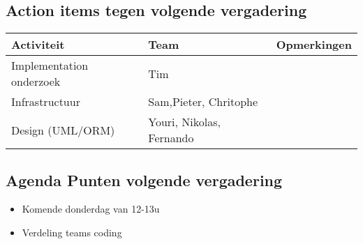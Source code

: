 \subsection{Action items tegen volgende vergadering}
\begin{table} [H]
	\centering
	\begin{tabular} {l|l|l}
		\textbf{Activiteit} & \textbf{Team} & \textbf{Opmerkingen} \\
		\hline
		Implementation onderzoek & Tim & \\
		Infrastructuur & Sam,Pieter, Chritophe & \\
		Design (UML/ORM) & Youri, Nikolas, Fernando & \\
	\end{tabular}
\end{table}

\subsection{Agenda Punten volgende vergadering}
	\begin{itemize}
		\item Komende donderdag van 12-13u
		\item Verdeling teams coding
	\end{itemize}



